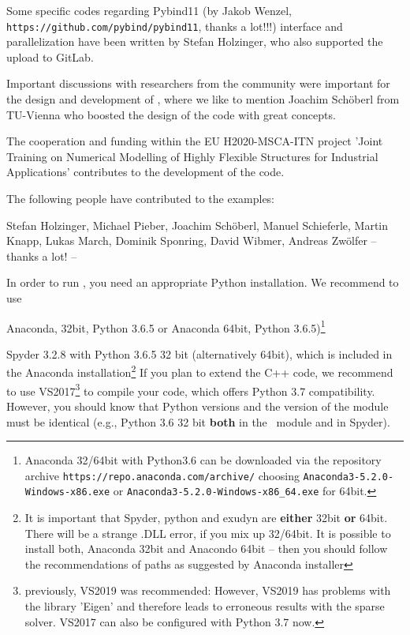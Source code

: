 Some specific codes regarding Pybind11 (by Jakob Wenzel, \texttt{https://github.com/pybind/pybind11}, thanks a lot!!!) interface and parallelization have been written by Stefan Holzinger, who also supported the upload to GitLab.

Important discussions with researchers from the community were important for the design and development of \codeName , where we like to mention Joachim Sch{\"o}berl from TU-Vienna who boosted the design of the code with great concepts. 

The cooperation and funding within the EU H2020-MSCA-ITN project 'Joint Training on Numerical Modelling of Highly Flexible Structures for Industrial Applications' contributes to the development of the code.

The following people have contributed to the examples:
\bi
	\item Stefan Holzinger, Michael Pieber, Joachim Sch{\"o}berl, Manuel Schieferle, Martin Knapp, Lukas March, Dominik Sponring, David Wibmer, Andreas Zw{\"o}lfer
\ei
-- thanks a lot! --
%

In order to run \codeName , you need an appropriate Python installation.
We recommend to use
\bi
  \item Anaconda, 32bit, Python 3.6.5 or Anaconda 64bit, Python 3.6.5)\footnote{Anaconda 32/64bit with Python3.6 can be downloaded via the repository archive \texttt{https://repo.anaconda.com/archive/} choosing \texttt{Anaconda3-5.2.0-Windows-x86.exe} or \texttt{Anaconda3-5.2.0-Windows-x86\_64.exe} for 64bit.}
	\item Spyder 3.2.8 with Python 3.6.5 32 bit (alternatively 64bit), which is included in the Anaconda installation\footnote{It is important that Spyder, python and exudyn are {\bf either} 32bit {\bf or} 64bit. There will be a strange .DLL error, if you mix up 32/64bit. It is possible to install both, Anaconda 32bit and Anacondo 64bit -- then you should follow the recommendations of paths as suggested by Anaconda installer}
\ei
If you plan to extend the C++ code, we recommend to use VS2017\footnote{previously, VS2019 was recommended: However, VS2019 has problems with the library 'Eigen' and therefore leads to erroneous results with the sparse solver. VS2017 can also be configured with Python 3.7 now.} to compile your code, which offers Python 3.7 compatibility.
However, you should know that Python versions and the version of the module must be identical (e.g., Python 3.6 32 bit {\bf both} in the \codeName\ module and in Spyder).

